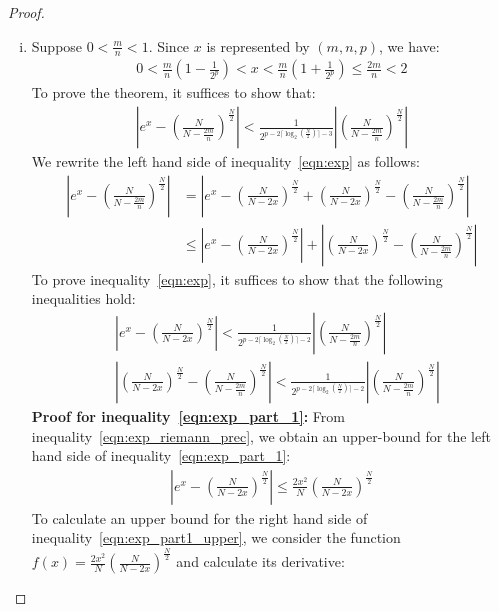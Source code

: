 \documentclass{article}
\numberwithin{mytheorem}{section}
\begin{document}
\begin{proof}
\textit{\\}
\begin{enumerate}[i.]
\item
Suppose $0<\frac{m}{n}<1$. Since $x$ is represented by $(m,n,p)$, we have:
\begin{align}
0<\frac{m}{n}(1-\frac{1}{2^p})<x<\frac{m}{n}(1+\frac{1}{2^p})\leq \frac{2m}{n}<2\label{eqn:exp_bound}
\end{align}
To prove the theorem, it suffices to show that:
\begin{align}
|e^x-(\frac{N}{N-\frac{2m}{n}})^{\frac{N}{2}}|<\frac{1}{2^{p-2\lceil \log_2(\frac{N}{2})\rceil-3}}|(\frac{N}{N-\frac{2m}{n}})^{\frac{N}{2}}|\label{eqn:exp}
\end{align}
We rewrite the left hand side of inequality~\eqref{eqn:exp} as follows:
\begin{align*}
|e^x-(\frac{N}{N-\frac{2m}{n}})^{\frac{N}{2}}|&=|e^x-(\frac{N}{N-2x})^{\frac{N}{2}}+(\frac{N}{N-2x})^{\frac{N}{2}}-(\frac{N}{N-\frac{2m}{n}})^{\frac{N}{2}}|\\
&\leq |e^x-(\frac{N}{N-2x})^{\frac{N}{2}}|+|(\frac{N}{N-2x})^{\frac{N}{2}}-(\frac{N}{N-\frac{2m}{n}})^{\frac{N}{2}}|
\end{align*}
To prove inequality~\eqref{eqn:exp}, it suffices to show that the following inequalities hold:
\begin{align}
&|e^x-(\frac{N}{N-2x})^{\frac{N}{2}}|<\frac{1}{2^{p-2\lceil \log_2(\frac{N}{2})\rceil-2}}|(\frac{N}{N-\frac{2m}{n}})^{\frac{N}{2}}|\label{eqn:exp_part_1} \\
&|(\frac{N}{N-2x})^{\frac{N}{2}}-(\frac{N}{N-\frac{2m}{n}})^{\frac{N}{2}}|<\frac{1}{2^{p-2\lceil\log_2(\frac{N}{2}) \rceil-2}}|(\frac{N}{N-\frac{2m}{n}})^{\frac{N}{2}}|\label{eqn:exp_part_2}
\end{align}
\textbf{Proof for inequality~\eqref{eqn:exp_part_1}:} %
From inequality~\eqref{eqn:exp_riemann_prec}, we obtain an upper-bound for the left hand side of inequality~\eqref{eqn:exp_part_1}:
\begin{align}
|e^x-(\frac{N}{N-2x})^{\frac{N}{2}}|\leq \frac{2x^2}{N}(\frac{N}{N-2x})^{\frac{N}{2}}\label{eqn:exp_part1_upper}
\end{align} 
To calculate an upper bound for the right hand side of inequality~\eqref{eqn:exp_part1_upper}, we consider the function $f(x)=\frac{2x^2}{N}(\frac{N}{N-2x})^{\frac{N}{2}}$ and calculate its derivative:

\end{enumerate}
\end{proof}
\end{document}
